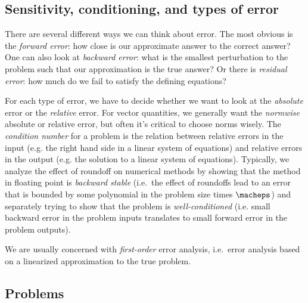 \documentclass[12pt, leqno]{article}
\begin{document}
\subsection{Sensitivity, conditioning, and types of error}

There are several different ways we can think about error.  The most
obvious is the {\em forward error}: how close is our approximate
answer to the correct answer?  One can also look at {\em backward
  error}: what is the smallest perturbation to the problem such that
our approximation is the true answer?  Or there is {\em residual
  error}: how much do we fail to satisfy the defining equations?

For each type of error, we have to decide whether we want to look at
the {\em absolute} error or the {\em relative} error.  For vector
quantities, we generally want the {\em normwise} absolute or relative
error, but often it's critical to choose norms wisely.  The
{\em condition number} for a problem is the relation between relative
errors in the input (e.g. the right hand side in a linear system of
equations) and relative errors in the output (e.g. the solution to a
linear system of equations).  Typically, we analyze the effect of
roundoff on numerical methods by showing that the method in floating
point is {\em backward stable} (i.e.~the effect of roundoffs lead to
an error that is bounded by some polynomial in the problem size
times $\macheps$) and separately trying to show that the problem is
{\em well-conditioned} (i.e. small backward error in the problem inputs
translates to small forward error in the problem outputs).

We are usually concerned with {\em first-order} error analysis,
i.e.~error analysis based on a linearized approximation to the true
problem.

\subsection{Problems}
\end{document}
